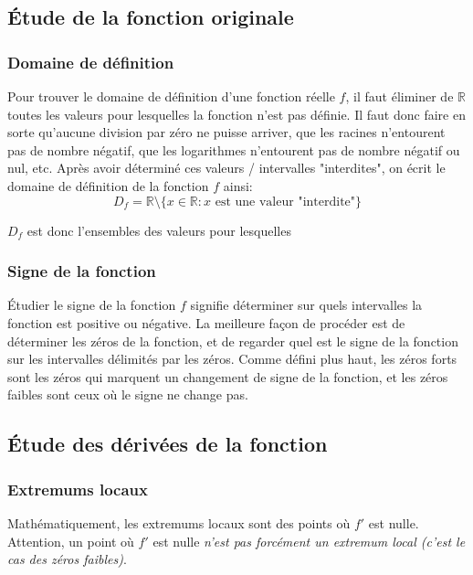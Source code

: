 \documentclass{article}
\numberwithin{equation}{subsection}
\begin{document}
\subsection{Étude de la fonction originale}

\subsubsection{Domaine de définition}
Pour trouver le domaine de définition d'une fonction réelle \(f\), il faut éliminer de \(\mathbb{R}\) toutes les valeurs pour lesquelles la fonction n'est pas définie. Il faut donc faire en sorte qu'aucune division par zéro ne puisse arriver, que les racines n'entourent pas de nombre négatif, que les logarithmes n'entourent pas de nombre négatif ou nul, etc. Après avoir déterminé ces valeurs / intervalles "interdites", on écrit le domaine de définition de la fonction \(f\) ainsi:
\begin{equation*}
	D_f = \mathbb{R} \setminus \{ x \in \mathbb{R} : x \text{ est une valeur "interdite"} \}
\end{equation*}

\(D_f\) est donc l'ensembles des valeurs pour lesquelles 

\subsubsection{Signe de la fonction}
Étudier le signe de la fonction \(f\) signifie déterminer sur quels intervalles la fonction est positive ou négative. La meilleure façon de procéder est de déterminer les zéros de la fonction, et de regarder quel est le signe de la fonction sur les intervalles délimités par les zéros. Comme défini plus haut, les zéros forts sont les zéros qui marquent un changement de signe de la fonction, et les zéros faibles sont ceux où le signe ne change pas.

\subsection{Étude des dérivées de la fonction}

\subsubsection{Extremums locaux}
Mathématiquement, les extremums locaux sont des points où \(f'\) est nulle. Attention, un point où \(f'\) est nulle \emph{n'est pas forcément un extremum local (c'est le cas des zéros faibles)}. \\
\end{document}
